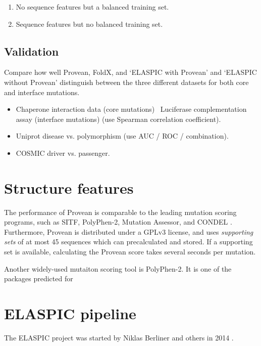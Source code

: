 \begin{enumerate}
	\item No sequence features but a balanced training set.
	\item Sequence features but no balanced training set.
\end{enumerate}






\subsection{Validation}

Compare how well Provean, FoldX, and `ELASPIC with Provean' and `ELASPIC without Provean' distinguish between the three different datasets for both core and interface mutations.

\begin{itemize}
\item Chaperone interaction data (core mutations) \ Luciferase complementation assay (interface mutations) (use Spearman correlation coefficient).
\item Uniprot disease vs. polymorphism (use AUC / ROC / combination).
\item COSMIC driver vs. passenger.
\end{itemize}






\section{Structure features}

The performance of Provean is comparable to the leading mutation scoring programs, such as SITF, PolyPhen-2, Mutation Assessor, and CONDEL \cite{choi_predicting_2012}. Furthermore, Provean is distributed under a GPLv3 license, and uses \textit{supporting sets} of at most 45 sequences which can precalculated and stored. If a supporting set is available, calculating the Provean score takes several seconds per mutation.

Another widely-used mutaiton scoring tool is PolyPhen-2. It is one of the packages predicted for




\section{ELASPIC pipeline}

The ELASPIC project was started by Niklas Berliner and others in 2014 \cite{berliner_combining_2014}.

